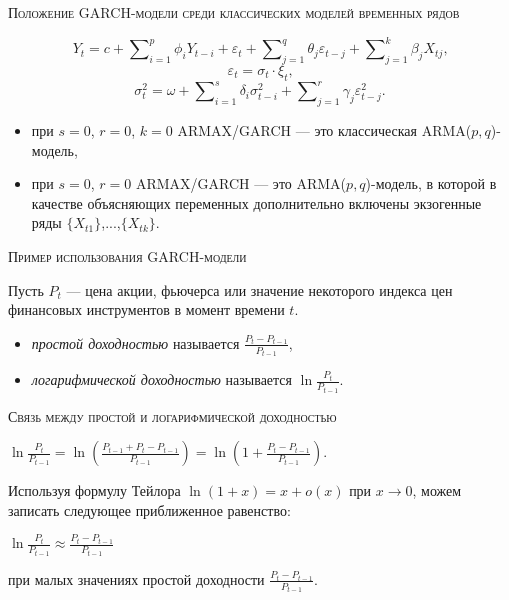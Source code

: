 \begin{center}
\textsc{Положение GARCH-модели среди классических моделей временных рядов}
\end{center}
\[
    Y_t = c + \sum\nolimits_{i=1}^p{{\phi_i}{Y_{t-i}}} + \varepsilon_t + \sum\nolimits_{j=1}^q{{\theta_j}{\varepsilon_{t-j}}} + \sum\nolimits_{j=1}^k{{\beta_j}{X_{tj}}} \text{,}
\]
\[
    \varepsilon_t = \sigma_t\cdot\xi_t \text{,}
\]
\[
    \sigma_t^2 = \omega + \sum\nolimits_{i=1}^s{\delta_i\sigma_{t-i}^2 + \sum\nolimits_{j=1}^r{\gamma_j\varepsilon_{t-j}^2}} \text{.}
\]

\begin{itemize}
  \item при $s=0$, $r=0$, $k=0$ ARMAX/GARCH --- это классическая ARMA($p,q$)-модель,
  \item при $s=0$, $r=0$ ARMAX/GARCH --- это ARMA($p,q$)-модель, в которой в качестве объясняющих переменных дополнительно включены экзогенные ряды $\{X_{t1}\}$,...,$\{X_{tk}\}$.
\end{itemize}

\begin{center}
\textsc{Пример использования GARCH-модели}
\end{center}

Пусть ${P_t}$ --- цена акции, фьючерса или значение некоторого индекса цен финансовых инструментов в момент времени $t$.
\begin{itemize}
  \item \textit{простой доходностью} называется $\frac{P_t-P_{t-1}}{P_{t-1}}$,
  \item \textit{логарифмической доходностью} называется $\ln\frac{P_t}{P_{t-1}}$.
\end{itemize}
\textsc{Связь между простой и логарифмической доходностью}
\begin{center}
    $\ln\frac{P_t}{P_{t-1}} = \ln\left(\frac{P_{t-1} + P_t - P_{t-1}}{P_{t-1}}\right) = \ln\left(1 + \frac{P_t - P_{t-1}}{P_{t-1}}\right)$.
\end{center}
Используя формулу Тейлора $\ln(1+x) = x + o(x)$ при $x\rightarrow0$, можем записать следующее приближенное равенство:
\begin{center}
    $\ln\frac{P_t}{P_{t-1}} \approx \frac{P_t - P_{t-1}}{P_{t-1}}$
\end{center}
при малых значениях простой доходности $\frac{P_t - P_{t-1}}{P_{t-1}}$.

